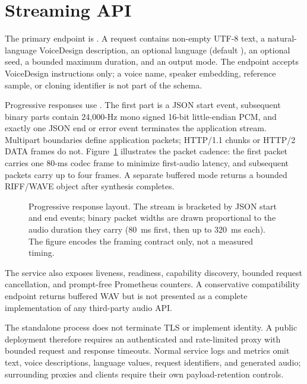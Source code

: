 \section{Streaming API}

The primary endpoint is
. A request contains non-empty UTF-8 text, a
natural-language VoiceDesign description, an optional language (default
), an optional seed, a bounded maximum duration, and an output mode.
The endpoint accepts VoiceDesign instructions only; a voice name, speaker
embedding, reference sample, or cloning identifier is not part of the schema.

Progressive responses use . The first part is a JSON
start event, subsequent binary parts contain 24,000-Hz mono signed 16-bit
little-endian PCM, and exactly one JSON end or error event terminates the
application stream. Multipart boundaries define application packets; HTTP/1.1
chunks or HTTP/2 DATA frames do not. Figure~\ref{fig:streaming-cadence}
illustrates the packet cadence: the first packet carries one 80-ms codec frame
to minimize first-audio latency, and subsequent packets carry up to four
frames. A separate buffered mode returns a bounded RIFF/WAVE object after
synthesis completes.

\begin{figure}[t]
  \centering
  
  \caption{Progressive response layout. The stream is bracketed by JSON start
  and end events; binary packet widths are drawn proportional to the audio
  duration they carry (80~ms first, then up to 320~ms each). The figure
  encodes the framing contract only, not a measured timing.}
  \label{fig:streaming-cadence}
\end{figure}

The service also exposes liveness, readiness, capability discovery, bounded
request cancellation, and prompt-free Prometheus counters. A conservative
compatibility endpoint returns buffered WAV but is not presented as a complete
implementation of any third-party audio API.

The standalone process does not terminate TLS or implement identity. A public
deployment therefore requires an authenticated and rate-limited proxy with
bounded request and response timeouts. Normal service logs and metrics omit
text, voice descriptions, language values, request identifiers, and generated
audio; surrounding proxies and clients require their own payload-retention
controls.
